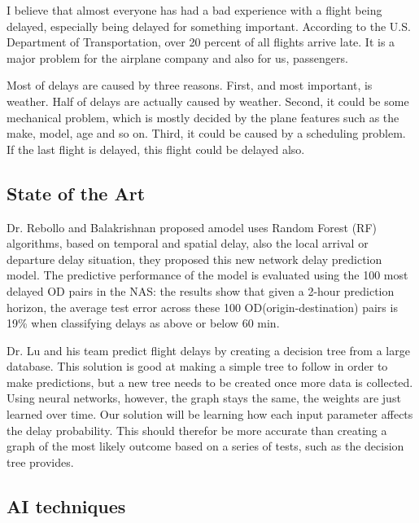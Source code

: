 \documentclass[12pt]{article}
\begin{document}
I believe that almost everyone has had a bad experience with a flight being 
delayed, especially being delayed for something important. According to the
U.S. Department of Transportation, over 20 percent of all flights
arrive late.\cite{4732894}  
It is a major problem for the airplane company and also for us, passengers. 

Most of delays are caused by three reasons. First, and most important, is 
weather. Half of delays are actually caused by
weather\cite{5655493}. Second, it could  
be some mechanical problem\cite{6891588}, which is mostly decided by the plane
features such as the make, model, age and so on. Third, it could be
caused by a scheduling problem. If the last flight is delayed, this flight 
could be delayed also. \cite{5}

\subsection{State of the Art}


Dr. Rebollo and Balakrishnan\cite{5} proposed amodel uses Random Forest (RF)
algorithms, based on temporal and spatial delay, also the local
arrival or departure delay situation, they proposed this new
network delay prediction model. The predictive performance of the model is
evaluated using the 100 most delayed OD pairs in the NAS:
the results show that given a 2-hour prediction horizon, the
average test error across these 100 OD(origin-destination) pairs is 19\% when
classifying delays as above or below 60 min. 

Dr. Lu and his team predict flight delays by creating a decision tree
from a large database. \cite{4732894}This solution is good at making a
simple tree to follow in order to  make predictions, but a new tree needs to be
created once more data is collected. 
Using neural networks, however, the graph stays the same, the weights are just
learned over time. Our solution will be learning how each input
parameter affects the delay probability. This should therefor be more
accurate than creating a graph  
of the most likely outcome based on a series of tests, such as the decision tree 
provides. 

\subsection{AI techniques}
\end{document}
